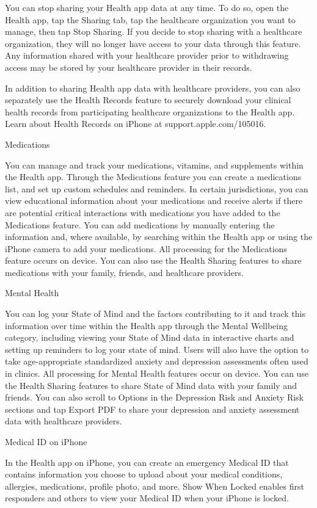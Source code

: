 You can stop sharing your Health app data at any time. To do so, open the Health app, tap the Sharing tab, tap the healthcare organization you want to manage, then tap Stop Sharing. If you decide to stop sharing with a healthcare organization, they will no longer have access to your data through this feature. Any information shared with your healthcare provider prior to withdrawing access may be stored by your healthcare provider in their records.

In addition to sharing Health app data with healthcare providers, you can also separately use the Health Records feature to securely download your clinical health records from participating healthcare organizations to the Health app. Learn about Health Records on iPhone at support.apple.com/105016.

Medications

You can manage and track your medications, vitamins, and supplements within the Health app. Through the Medications feature you can create a medications list, and set up custom schedules and reminders. In certain jurisdictions, you can view educational information about your medications and receive alerts if there are potential critical interactions with medications you have added to the Medications feature. You can add medications by manually entering the information and, where available, by searching within the Health app or using the iPhone camera to add your medications. All processing for the Medications feature occurs on device. You can also use the Health Sharing features to share medications with your family, friends, and healthcare providers.

Mental Health

You can log your State of Mind and the factors contributing to it and track this information over time within the Health app through the Mental Wellbeing category, including viewing your State of Mind data in interactive charts and setting up reminders to log your state of mind. Users will also have the option to take age-appropriate standardized anxiety and depression assessments often used in clinics. All processing for Mental Health features occur on device. You can use the Health Sharing features to share State of Mind data with your family and friends. You can also scroll to Options in the Depression Risk and Anxiety Risk sections and tap Export PDF to share your depression and anxiety assessment data with healthcare providers.

Medical ID on iPhone

In the Health app on iPhone, you can create an emergency Medical ID that contains information you choose to upload about your medical conditions, allergies, medications, profile photo, and more. Show When Locked enables first responders and others to view your Medical ID when your iPhone is locked.

